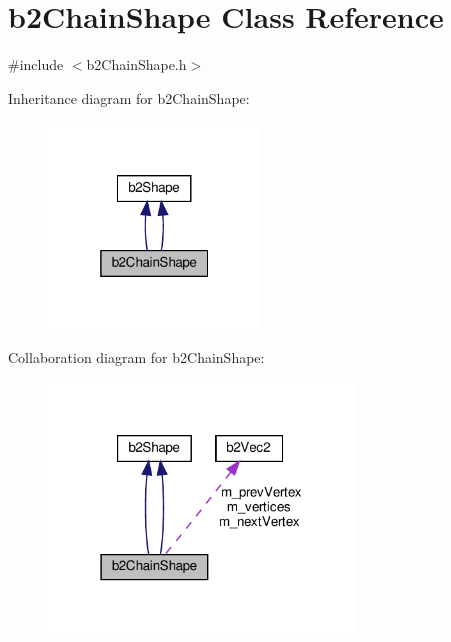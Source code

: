\hypertarget{classb2ChainShape}{}\section{b2\+Chain\+Shape Class Reference}
\label{classb2ChainShape}


{\ttfamily \#include $<$b2\+Chain\+Shape.\+h$>$}



Inheritance diagram for b2\+Chain\+Shape\+:
\nopagebreak
\begin{figure}[H]
\begin{center}
\leavevmode
\includegraphics[width=160pt]{classb2ChainShape__inherit__graph}
\end{center}
\end{figure}


Collaboration diagram for b2\+Chain\+Shape\+:
\nopagebreak
\begin{figure}[H]
\begin{center}
\leavevmode
\includegraphics[width=231pt]{classb2ChainShape__coll__graph}
\end{center}
\end{figure}
